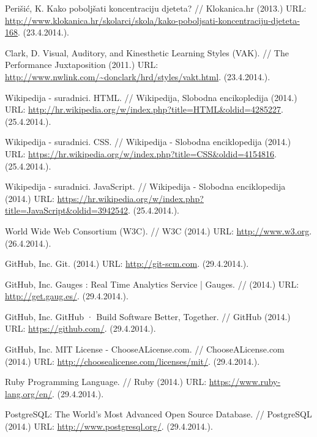 \documentclass[11pt]{scrreprt}
\begin{document}
\begin{thebibliography}{99}

  \raggedright

   Perišić, K. Kako poboljšati koncentraciju djeteta? //
    Klokanica.hr (2013.) URL:
    \url{http://www.klokanica.hr/skolarci/skola/kako-poboljsati-koncentraciju-djeteta-168}.
    (23.4.2014.).

   Clark, D. Visual, Auditory, and Kinesthetic Learning Styles
    (VAK). // The Performance Juxtaposition (2011.) URL:
    \url{http://www.nwlink.com/~donclark/hrd/styles/vakt.html}. (23.4.2014.).

   Wikipedija - suradnici. HTML. // Wikipedija, Slobodna
    encikopledija (2014.) URL:
    \url{http://hr.wikipedia.org/w/index.php?title=HTML&oldid=4285227}.
    (25.4.2014.).

   Wikipedija - suradnici. CSS. // Wikipedija - Slobodna
    enciklopedija (2014.) URL:
    \url{https://hr.wikipedia.org/w/index.php?title=CSS&oldid=4154816}.
    (25.4.2014.).

   Wikipedija - suradnici. JavaScript. // Wikipedija - Slobodna
    enciklopedija (2014.) URL:
    \url{https://hr.wikipedia.org/w/index.php?title=JavaScript&oldid=3942542}.
    (25.4.2014.).

   World Wide Web Consortium (W3C). // W3C (2014.) URL:
    \url{http://www.w3.org}. (26.4.2014.).

   GitHub, Inc. Git. (2014.) URL: \url{http://git-scm.com}.
    (29.4.2014.).

   GitHub, Inc. Gauges : Real Time Analytics Service | Gauges.
    // (2014.) URL: \url{http://get.gaug.es/}. (29.4.2014.).

   GitHub, Inc. GitHub · Build Software Better, Together. //
    GitHub (2014.) URL: \url{https://github.com/}. (29.4.2014.).

   GitHub, Inc. MIT License - ChooseALicense.com. //
    ChooseALicense.com (2014.) URL:
    \url{http://choosealicense.com/licenses/mit/}. (29.4.2014.).

   Ruby Programming Language. // Ruby (2014.) URL:
    \url{https://www.ruby-lang.org/en/}. (29.4.2014.).

   PostgreSQL: The World’s Most Advanced Open Source
    Database. // PostgreSQL (2014.) URL: \url{http://www.postgresql.org/}.
    (29.4.2014.).


\end{thebibliography}
\end{document}
